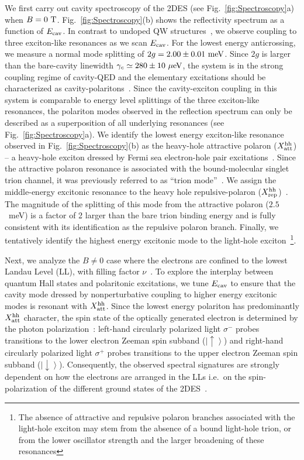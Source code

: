 \documentclass[prl,twocolumn,10pt,showpacs,superscriptaddress,longbibliography,footnoteinbib]{revtex4-1}
\begin{document}
We first carry out cavity spectroscopy of the 2DES (see Fig.~\ref{fig:Spectroscopy}a) when $B=0~{\rm T}$. Fig.~\ref{fig:Spectroscopy}(b) shows the reflectivity spectrum as a function of $E_{\rm cav}$. In contrast to undoped QW structures~\cite{Weisbuch1992}, we observe coupling to three exciton-like resonances as we scan $E_{\rm cav}$. For the lowest energy anticrossing, we measure a normal mode splitting of $2g=2.00 \pm 0.01~{\rm meV}$. Since $2g$ is larger than the bare-cavity linewidth $\gamma_c \simeq 280 \pm 10~{\rm \mu eV}$, the system is in the strong coupling regime of cavity-QED and the elementary excitations should be characterized as cavity-polaritons~\cite{Weisbuch1992}. Since the cavity-exciton coupling in this system is comparable to energy level splittings of the three exciton-like resonances, the polariton modes observed in the reflection spectrum can only be described as a superposition of all underlying resonances (see Fig.~\ref{fig:Spectroscopy}a). We identify the lowest energy exciton-like resonance observed in Fig.~\ref{fig:Spectroscopy}(b) as the heavy-hole attractive polaron ($X^{\rm hh}_{\rm att}$) -- a heavy-hole exciton dressed by Fermi sea electron-hole pair excitations~\cite{Sidler2017}. Since the attractive polaron resonance is associated with the bound-molecular singlet trion channel, it was previously referred to as ``trion mode''~\cite{Esser2001,BarJoseph2005}. We assign the middle-energy excitonic resonance to the heavy hole repulsive-polaron ($X^{\rm hh}_{\rm rep}$)~\cite{Sidler2017,Efimkin2017}. The magnitude of the splitting of this mode from the attractive polaron ($2.5$~meV) is a factor of 2 larger than the bare trion binding energy and is fully consistent with its identification as the repulsive polaron branch. Finally, we tentatively identify the highest energy excitonic mode to the light-hole exciton~\footnote{The absence of attractive and repulsive polaron branches associated with the light-hole exciton may stem from the absence of a bound light-hole trion, or from the lower oscillator strength and the larger broadening of these resonances}.

Next, we analyze the $B \neq 0$ case where the electrons are confined to the lowest Landau Level (LL), with filling factor $\nu$~\cite{Prange1989}. To explore the interplay between quantum Hall states and polaritonic excitations, we tune $E_{\rm cav}$ to ensure that the cavity mode dressed by nonperturbative coupling to higher energy excitonic modes is resonant with $X^{\rm hh}_{\rm att}$. Since the lowest energy polariton has predominantly $X^{\rm hh}_{\rm att}$ character, the spin state of the optically generated electron is determined by the photon polarization~\cite{Smolka2014}: left-hand circularly polarized light $\sigma^-$ probes transitions to the lower electron Zeeman spin subband ($\left | \uparrow \right >$) and right-hand circularly polarized light $\sigma^+$ probes transitions to the upper electron Zeeman spin subband ($\left | \downarrow \right >$). Consequently, the observed spectral signatures are strongly dependent on how the electrons are arranged in the LLs i.e.\ on the spin-polarization of the different ground states of the 2DES~\cite{Goldberg1992,Groshaus2007}.
\end{document}
